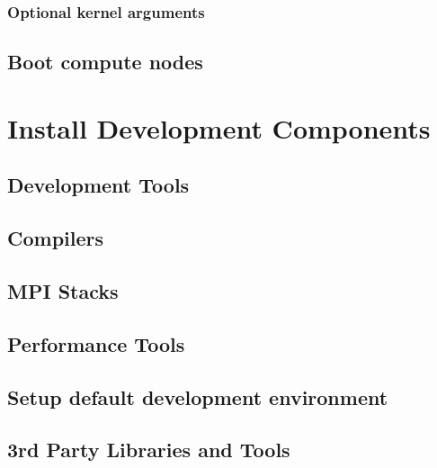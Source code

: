 \documentclass[letterpaper]{article}
\begin{document}
\subsubsection{Optional kernel arguments} \label{sec:optional_kargs}



\subsection{Boot compute nodes} \label{sec:boot_computes}


\section{Install \OHPC{} Development Components}


\subsection{Development Tools} \label{sec:install_dev_tools}


\vspace*{-0.15cm}
\subsection{Compilers} \label{sec:install_compilers}


\subsection{MPI Stacks} \label{sec:mpi}


\subsection{Performance Tools} \label{sec:install_perf_tools}


\subsection{Setup default development environment}


\vspace*{0.3cm}
\subsection{3rd Party Libraries and Tools} \label{sec:3rdparty}



\vspace*{0.1cm}

\vspace*{0.5cm}
\end{document}
